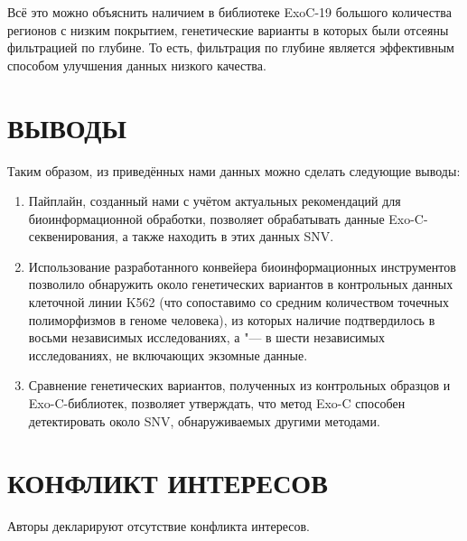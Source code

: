 \documentclass[12pt, twoside, a4paper]{article}
\newcommand{\thousands}{тыс.}
\newcommand{\mln}{млн}
\begin{document}
Всё это можно объяснить наличием в библиотеке ExoC-19 большого количества регионов с низким покрытием, генетические варианты в которых были отсеяны фильтрацией по глубине.
То есть, фильтрация по глубине является эффективным способом улучшения данных низкого качества.

\section*{ВЫВОДЫ}

Таким образом, из приведённых нами данных можно сделать следующие выводы:

\begin{enumerate}
	\item Пайплайн, созданный нами с учётом актуальных рекомендаций для биоинформационной обработки, позволяет обрабатывать данные Exo-C\hyp{}секвенирования, а также находить в этих данных SNV.
	\item Использование разработанного конвейера биоинформационных инструментов позволило обнаружить около \numprint[\mln]{5.5} генетических вариантов в контрольных данных клеточной линии K562 (что сопоставимо со средним количеством точечных полиморфизмов в геноме человека), из которых наличие \numprint[\thousands]{75} подтвердилось в восьми независимых исследованиях, а \numprint[\mln]{1} "--- в шести независимых исследованиях, не включающих экзомные данные.
	\item Сравнение генетических вариантов, полученных из контрольных образцов и Exo-C\hyp{}библиотек, позволяет утверждать, что метод Exo-C способен детектировать около  SNV, обнаруживаемых другими методами.
\end{enumerate}

\section*{КОНФЛИКТ ИНТЕРЕСОВ}

Авторы декларируют отсутствие конфликта интересов.


\clearpage

\newpage
\end{document}
